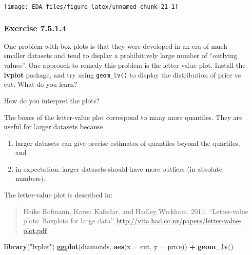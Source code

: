 \documentclass[]{book}
\newenvironment{Shaded}{\begin{snugshade}}{\end{snugshade}}
\newcommand{\DataTypeTok}[1]{\textcolor[rgb]{0.13,0.29,0.53}{#1}}
\newcommand{\KeywordTok}[1]{\textcolor[rgb]{0.13,0.29,0.53}{\textbf{#1}}}
\newcommand{\NormalTok}[1]{#1}
\newcommand{\OperatorTok}[1]{\textcolor[rgb]{0.81,0.36,0.00}{\textbf{#1}}}
\newcommand{\StringTok}[1]{\textcolor[rgb]{0.31,0.60,0.02}{#1}}
\providecommand{\tightlist}{%
  \setlength{\itemsep}{0pt}\setlength{\parskip}{0pt}}
\theoremstyle{plain}
\theoremstyle{remark}
\theoremstyle{definition}
\theoremstyle{definition}
\theoremstyle{definition}
\theoremstyle{remark}
\begin{document}
\begin{center}\texttt{[image: EDA\_files/figure-latex/unnamed-chunk-21-1]} \end{center}

\hypertarget{exercise-7.5.1.4}{%
\subsubsection*{\texorpdfstring{Exercise
{7.5.1.4}}{Exercise 7.5.1.4}}\label{exercise-7.5.1.4}}

One problem with box plots is that they were developed in an era of much
smaller datasets and tend to display a prohibitively large number of
``outlying values''. One approach to remedy this problem is the letter
value plot. Install the \textbf{lvplot} package, and try using
\texttt{geom\_lv()} to display the distribution of price vs cut. What do
you learn?

How do you interpret the plots?

The boxes of the letter-value plot correspond to many more quantiles.
They are useful for larger datasets because

\begin{enumerate}
\def\labelenumi{\arabic{enumi}.}
\tightlist
\item
  larger datasets can give precise estimates of quantiles beyond the
  quartiles, and
\item
  in expectation, larger datasets should have more outliers (in absolute
  numbers).
\end{enumerate}

The letter-value plot is described in:

\begin{quote}
Heike Hofmann, Karen Kafadar, and Hadley Wickham. 2011. ``Letter-value
plots: Boxplots for large data''
\url{http://vita.had.co.nz/papers/letter-value-plot.pdf}
\end{quote}

\begin{Shaded}
\begin{Highlighting}[]
\KeywordTok{library}\NormalTok{(}\StringTok{"lvplot"}\NormalTok{)}
\KeywordTok{ggplot}\NormalTok{(diamonds, }\KeywordTok{aes}\NormalTok{(}\DataTypeTok{x =}\NormalTok{ cut, }\DataTypeTok{y =}\NormalTok{ price)) }\OperatorTok{+}
\StringTok{  }\KeywordTok{geom_lv}\NormalTok{()}
\end{Highlighting}
\end{Shaded}
\end{document}
